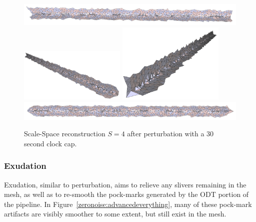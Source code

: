 \documentclass[12pt]{drexelthesis}
\let\Oldsubsubsection\subsubsection
\renewcommand{\subsubsection}{\FloatBarrier\Oldsubsubsection}
\begin{document}
\begin{figure}[!ht]
	\centering
		\includegraphics[width=5in]{simulated-lab-scan/0noise/optimizedNeat/scalespace4perturb00.png}
		\includegraphics[width=2in]{simulated-lab-scan/0noise/optimizedNeat/scalespace4perturb01.png}
		\includegraphics[width=2in]{simulated-lab-scan/0noise/optimizedNeat/scalespace4perturb02.png}
		\includegraphics[width=5in]{simulated-lab-scan/0noise/optimizedNeat/scalespace4perturb03.png}
		\caption[Scale-Space reconstruction $S = 4$ after perturbation with a 30 second clock cap]{\centering Scale-Space reconstruction $S = 4$ after perturbation with a 30 second clock cap.}
	\label{zeronoise:scalespace4perturb}
\end{figure}

\subsubsection{Exudation}

Exudation, similar to perturbation, aims to relieve any slivers remaining in the mesh, as well as to re-smooth the pock-marks generated by the ODT portion of the pipeline. In Figure~\ref{zeronoise:advancedeverything}, many of these pock-mark artifacts are visibly smoother to some extent, but still exist in the mesh.
\end{document}
